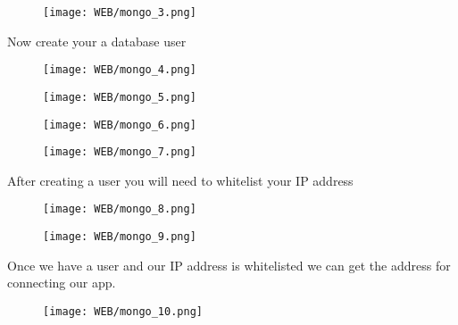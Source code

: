 \documentclass{42-en}
\begin{document}
\begin{figure}[H]
    \begin{center}
        \texttt{[image: WEB/mongo\_3.png]}
    \end{center}
\end{figure}

\newpage
Now create your a database user
\begin{figure}[H]
    \begin{center}
        \texttt{[image: WEB/mongo\_4.png]}
    \end{center}
\end{figure}

\begin{figure}[H]
    \begin{center}
        \texttt{[image: WEB/mongo\_5.png]}
    \end{center}
\end{figure}

\begin{figure}[H]
    \begin{center}
        \texttt{[image: WEB/mongo\_6.png]}
    \end{center}
\end{figure}

\begin{figure}[H]
    \begin{center}
        \texttt{[image: WEB/mongo\_7.png]}
    \end{center}
\end{figure}

\newpage
After creating a user you will need to whitelist your IP address
\begin{figure}[H]
    \begin{center}
        \texttt{[image: WEB/mongo\_8.png]}
    \end{center}
\end{figure}

\begin{figure}[H]
    \begin{center}
        \texttt{[image: WEB/mongo\_9.png]}
    \end{center}
\end{figure}

\newpage
Once we have a user and our IP address is whitelisted we can get the address for connecting our app.
\begin{figure}[H]
    \begin{center}
        \texttt{[image: WEB/mongo\_10.png]}
    \end{center}
\end{figure}
\end{document}
